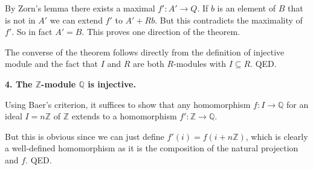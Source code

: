 \documentclass[12pt]{article}
\newcommand{\Z}{\mathbb{Z}}
\newcommand{\Q}{\mathbb{Q}}
\begin{document}
By Zorn's lemma there exists a maximal $f' : A' \to Q$. If $b$ is an element of $B$ that is not in $A'$ we can extend $f'$ to $A' + Rb$. But this contradicts the maximality of $f'$. So in fact $A' = B$. This proves one direction of the theorem.
 
The converse of the theorem follows directly from the definition of injective module and the fact that $I$ and $R$ are both $R$-modules with $I \subseteq R$. QED.

\textbf{4. The $\Z$-module $\Q$ is injective.}

Using Baer's criterion, it suffices to show that any homomorphism $f : I \to \Q$ for an ideal $I = n\Z$ of $\Z$ extends to a homomorphism $f' : \Z \to \Q$.

But this is obvious since we can just define $f'(i) = f(i + n\Z)$, which is clearly a well-defined homomorphism as it is the composition of the natural projection and $f$. QED.
\end{document}
